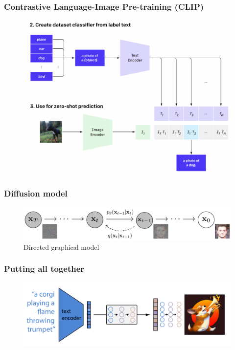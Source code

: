\documentclass[
	11pt, compress%
]{beamer}
\begin{document}
\begin{frame}
	\frametitle{Contrastive Language-Image Pre-training (CLIP)}
	\begin{figure}
		\includegraphics[width=0.83\linewidth]{Images/CLIP2.png}
		\cite{CLIP}
	\end{figure}
\end{frame}

\begin{frame}
	\frametitle{Diffusion model}
	\begin{figure}
		\includegraphics[width=0.83\linewidth]{Images/diffusionModel.png}
		\caption{Directed graphical model \cite{DBLP:journals/corr/abs-2006-11239}}
	\end{figure}
\end{frame}


\begin{frame}
	\frametitle{Putting all together}
	\begin{figure}
		\includegraphics[width=0.85\linewidth]{Images/highLevel.png}
		\cite{https://doi.org/10.48550/arxiv.2204.06125}
	\end{figure}
\end{frame}
\end{document}
